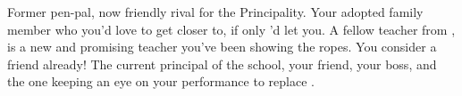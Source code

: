 \documentclass[char]{GL2020}
\begin{document}
\begin{itemz}[Notes]
	\item 
\end{itemz}

\begin{contacts}
	\contact{\cBeetle{}} Former pen-pal, now friendly rival for the Principality.
	\contact{\cAdopted{}} Your adopted family member who you’d love to get closer to, if only \cAdopted{\they}’d let you.
	\contact{\cInterpol{}} A fellow teacher from \pFarm{}, \cInterpol{} is a new and promising teacher you’ve been showing the ropes.  You consider \cInterpol{\them} a friend already!
\contact{\cPrincipal{}} The current principal of the school, your friend, your boss, and the one keeping an eye on your performance to replace \cPrincipal{\them}.
\end{contacts}
\end{document}
